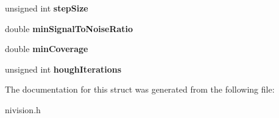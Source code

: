 \begin{DoxyCompactItemize}
\item 
\hypertarget{structStraightEdgeOptions__struct_ab3138dc499e03eb59b1aa3ea8a6c7c18}{
unsigned int {\bfseries stepSize}}
\label{structStraightEdgeOptions__struct_ab3138dc499e03eb59b1aa3ea8a6c7c18}

\item 
\hypertarget{structStraightEdgeOptions__struct_ab8657f6ca8712dd67d05564231ee1d27}{
double {\bfseries minSignalToNoiseRatio}}
\label{structStraightEdgeOptions__struct_ab8657f6ca8712dd67d05564231ee1d27}

\item 
\hypertarget{structStraightEdgeOptions__struct_a26484accfcff2b81160c155dc4881115}{
double {\bfseries minCoverage}}
\label{structStraightEdgeOptions__struct_a26484accfcff2b81160c155dc4881115}

\item 
\hypertarget{structStraightEdgeOptions__struct_a29293bcd761ffd6cf22a63d1cb6fde05}{
unsigned int {\bfseries houghIterations}}
\label{structStraightEdgeOptions__struct_a29293bcd761ffd6cf22a63d1cb6fde05}

\end{DoxyCompactItemize}


The documentation for this struct was generated from the following file:\begin{DoxyCompactItemize}
\item 
nivision.h\end{DoxyCompactItemize}
